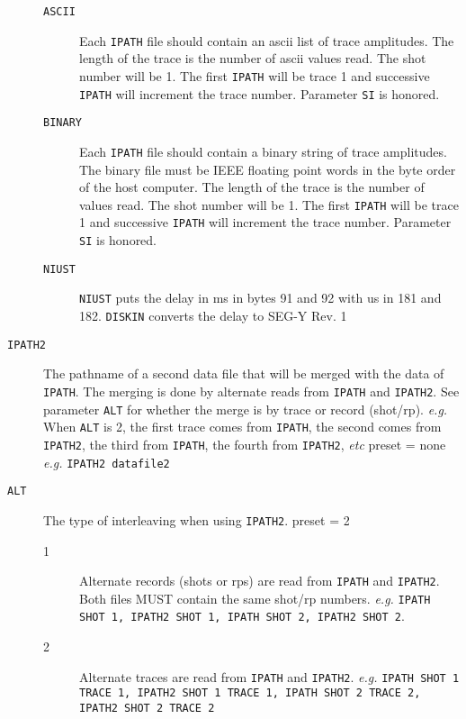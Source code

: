 \begin{description}
\begin{description}
        \item[\texttt{ASCII}]   Each \texttt{IPATH} file should contain an \gls{ascii} list of trace amplitudes.  The length of the trace is the number of \gls{ascii} values read.  The \gls{shot} number will be 1.  The first \texttt{IPATH} will be trace 1 and successive \texttt{IPATH} will increment the trace number.  Parameter \texttt{SI} is honored.
        \item[\texttt{BINARY}]   Each \texttt{IPATH} file should contain a binary string of trace amplitudes.  The binary file must be IEEE floating point words in the byte order of the host computer.  The length of the trace is the number of values read.  The \gls{shot} number will be 1.  The first \texttt{IPATH} will be trace 1 and successive \texttt{IPATH} will increment the trace number.  Parameter \texttt{SI} is honored.
        \item[\texttt{NIUST}]   \texttt{NIUST} puts the delay in ms in bytes 91 and 92 with us in 181 and 182.  \texttt{DISKIN} converts the delay to SEG-Y Rev. 1
    \end{description}

\item[\texttt{IPATH2}] The pathname of a second data file that will be merged with
         the data of \texttt{IPATH}.  The merging is done by alternate reads
         from \texttt{IPATH} and \texttt{IPATH2}.  See parameter \texttt{ALT} for whether the
         merge is by trace or record (\gls{shot}/\gls{rp}).  \textit{e.g.} When \texttt{ALT} is 2,
         the first trace comes from \texttt{IPATH}, the second comes from
         \texttt{IPATH2}, the third from \texttt{IPATH}, the fourth from \texttt{IPATH2}, \textit{etc}
         \Gls{preset} = none    \textit{e.g.}  \texttt{IPATH2 datafile2}

\item[\texttt{ALT}] The type of interleaving when using \texttt{IPATH2}. \Gls{preset} = 2
\begin{description}
\item[1] Alternate records (\glspl{shot} or \glspl{rp}) are read from \texttt{IPATH} and
         \texttt{IPATH2}.  Both files MUST contain the same \gls{shot}/\gls{rp} numbers.
         \textit{e.g.} \texttt{IPATH SHOT 1, IPATH2 SHOT 1, IPATH SHOT 2, IPATH2 SHOT 2}.
\item[2] Alternate traces are read from \texttt{IPATH} and \texttt{IPATH2}.  \textit{e.g.}
         \texttt{IPATH SHOT 1 TRACE 1, IPATH2 SHOT 1 TRACE 1, IPATH SHOT 2 TRACE 2, IPATH2 SHOT 2 TRACE 2}
\end{description}


\end{description}
